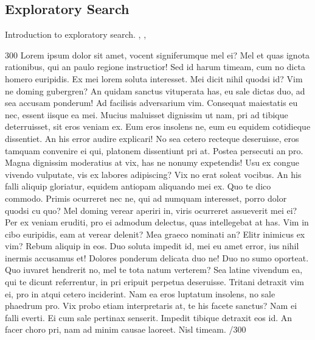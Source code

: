 \documentclass{sigchi}
\begin{document}
\subsection{Exploratory Search}
Introduction to exploratory search.
\cite{march06}, \cite{white09}, \cite{tvaro11}

300 Lorem ipsum dolor sit amet, vocent signiferumque mel ei? Mel et quas ignota rationibus, qui an paulo regione instructior! Sed id harum timeam, cum no dicta homero euripidis. Ex mei lorem soluta interesset. Mei dicit nihil quodsi id? Vim ne doming gubergren? An quidam sanctus vituperata has, eu sale dictas duo, ad sea accusam ponderum! Ad facilisis adversarium vim. Consequat maiestatis eu nec, essent iisque ea mei. Mucius maluisset dignissim ut nam, pri ad tibique deterruisset, sit eros veniam ex. Eum eros insolens ne, eum eu equidem cotidieque dissentiet. An his error audire explicari! No sea cetero recteque deseruisse, eros tamquam convenire ei qui, platonem dissentiunt pri at. Postea persecuti an pro. Magna dignissim moderatius at vix, has ne nonumy expetendis! Usu ex congue vivendo vulputate, vis ex labores adipiscing? Vix no erat soleat vocibus. An his falli aliquip gloriatur, equidem antiopam aliquando mei ex. Quo te dico commodo. Primis ocurreret nec ne, qui ad numquam interesset, porro dolor quodsi cu quo? Mel doming verear aperiri in, viris ocurreret assueverit mei ei? Per ex veniam eruditi, pro ei admodum delectus, quas intellegebat at has. Vim in cibo euripidis, eam at verear delenit? Mea graeco nominati an? Elitr inimicus ex vim? Rebum aliquip in eos. Duo soluta impedit id, mei eu amet error, ius nihil inermis accusamus et! Dolores ponderum delicata duo ne! Duo no sumo oporteat. Quo iuvaret hendrerit no, mel te tota natum verterem? Sea latine vivendum ea, qui te dicunt referrentur, in pri eripuit perpetua deseruisse. Tritani detraxit vim ei, pro in atqui cetero inciderint. Nam ea eros luptatum insolens, no sale phaedrum pro. Vix probo etiam interpretaris at, te his facete sanctus? Nam ei falli everti. Ei cum sale pertinax senserit. Impedit tibique detraxit eos id. An facer choro pri, nam ad minim causae laoreet. Nisl timeam. /300


\end{document}
